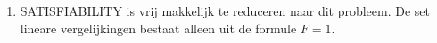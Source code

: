 \documentclass[11pt]{article}
\begin{document}
\begin{enumerate}
\begin{enumerate}
\begin{enumerate}[a]
                    \item
                        SATISFIABILITY is vrij makkelijk te reduceren naar dit
                        probleem. De set lineare vergelijkingen bestaat alleen
                        uit de formule $F=1$.

                \end{enumerate}

        \end{enumerate}
\end{enumerate}
\end{document}
